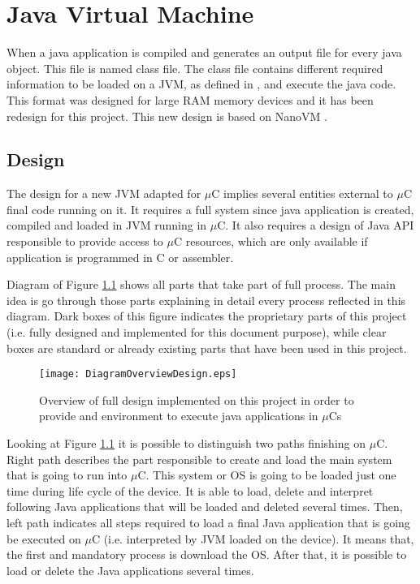 \chapter{Java Virtual Machine}\label{C:JVM}
When a java application is compiled and generates an output file for every java object. This file is named class file. The class file contains different required information to be loaded on a JVM, as defined in \cite{Art:JVMSE7}, and execute the java code. This format was designed for large RAM memory devices and it has been redesign for this project. This new design is based on NanoVM \cite{Art:NanoVM}.

\section{Design}\label{S:JVM:Design}
The design for a new JVM adapted for $\mu$C implies several entities external to $\mu$C final code running on it. It requires a full system since java application is created, compiled and loaded in JVM running in $\mu$C. It also requires a design of Java API responsible to provide access to $\mu$C resources, which are only available if application is programmed in C or assembler.

Diagram of Figure \ref{fig:C:JVM:OverviewDiagram} shows all parts that take part of full process. The main idea is go through those parts explaining in detail every process reflected in this diagram. Dark boxes of this figure indicates the proprietary parts of this project (i.e. fully designed and implemented for this document purpose), while clear boxes are standard or already existing parts that have been used in this project.

\begin{figure}[H]
\centering
\texttt{[image: DiagramOverviewDesign.eps]}
\caption{Overview of full design implemented on this project in order to provide and environment to execute java applications in $\mu$Cs}
\label{fig:C:JVM:OverviewDiagram}
\end{figure}

Looking at Figure \ref{fig:C:JVM:OverviewDiagram} it is possible to distinguish two paths finishing on $\mu$C. Right path describes the part responsible to create and load the main system that is going to run into $\mu$C. This system or OS is going to be loaded just one time during life cycle of the device. It is able to load, delete and interpret following Java applications that will be loaded and deleted several times. Then, left path indicates all steps required to load a final Java application that is going be executed on $\mu$C (i.e. interpreted by JVM loaded on the device). It means that, the first and mandatory process is download the OS. After that, it is possible to load or delete the Java applications several times.

